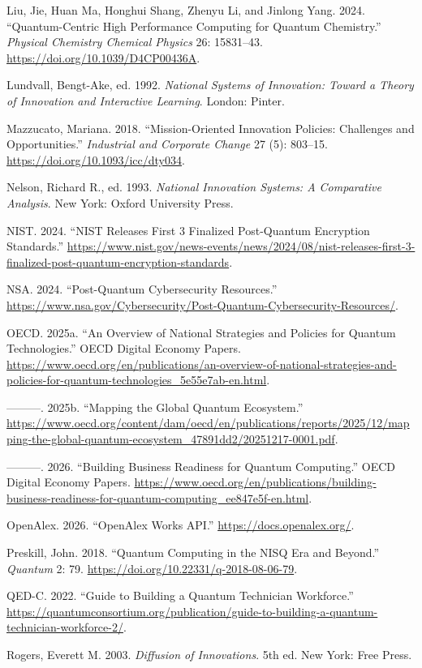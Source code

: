 \documentclass[
  11pt,
  letterpaper,
]{article}
\newlength{\cslhangindent}
\newenvironment{CSLReferences}[2] %
 {\begin{list}{}{%
  \setlength{\itemindent}{0pt}
  \setlength{\leftmargin}{0pt}
  \setlength{\parsep}{0pt}
  \ifodd #1
   \setlength{\leftmargin}{\cslhangindent}
   \setlength{\itemindent}{-1\cslhangindent}
  \fi
  \setlength{\itemsep}{#2\baselineskip}}}
 {\end{list}}
\begin{document}
\begin{CSLReferences}{1}{0}
Liu, Jie, Huan Ma, Honghui Shang, Zhenyu Li, and Jinlong Yang. 2024.
{``Quantum-Centric High Performance Computing for Quantum Chemistry.''}
\emph{Physical Chemistry Chemical Physics} 26: 15831--43.
\url{https://doi.org/10.1039/D4CP00436A}.

Lundvall, Bengt-Ake, ed. 1992. \emph{National Systems of Innovation:
Toward a Theory of Innovation and Interactive Learning}. London: Pinter.

Mazzucato, Mariana. 2018. {``Mission-Oriented Innovation Policies:
Challenges and Opportunities.''} \emph{Industrial and Corporate Change}
27 (5): 803--15. \url{https://doi.org/10.1093/icc/dty034}.

Nelson, Richard R., ed. 1993. \emph{National Innovation Systems: A
Comparative Analysis}. New York: Oxford University Press.

NIST. 2024. {``NIST Releases First 3 Finalized Post-Quantum Encryption
Standards.''}
\url{https://www.nist.gov/news-events/news/2024/08/nist-releases-first-3-finalized-post-quantum-encryption-standards}.

NSA. 2024. {``Post-Quantum Cybersecurity Resources.''}
\url{https://www.nsa.gov/Cybersecurity/Post-Quantum-Cybersecurity-Resources/}.

OECD. 2025a. {``An Overview of National Strategies and Policies for
Quantum Technologies.''} OECD Digital Economy Papers.
\url{https://www.oecd.org/en/publications/an-overview-of-national-strategies-and-policies-for-quantum-technologies_5e55e7ab-en.html}.

---------. 2025b. {``Mapping the Global Quantum Ecosystem.''}
\url{https://www.oecd.org/content/dam/oecd/en/publications/reports/2025/12/mapping-the-global-quantum-ecosystem_47891dd2/20251217-0001.pdf}.

---------. 2026. {``Building Business Readiness for Quantum
Computing.''} OECD Digital Economy Papers.
\url{https://www.oecd.org/en/publications/building-business-readiness-for-quantum-computing_ee847e5f-en.html}.

OpenAlex. 2026. {``OpenAlex Works API.''}
\url{https://docs.openalex.org/}.

Preskill, John. 2018. {``Quantum Computing in the NISQ Era and
Beyond.''} \emph{Quantum} 2: 79.
\url{https://doi.org/10.22331/q-2018-08-06-79}.

QED-C. 2022. {``Guide to Building a Quantum Technician Workforce.''}
\url{https://quantumconsortium.org/publication/guide-to-building-a-quantum-technician-workforce-2/}.

Rogers, Everett M. 2003. \emph{Diffusion of Innovations}. 5th ed. New
York: Free Press.

\end{CSLReferences}
\end{document}
